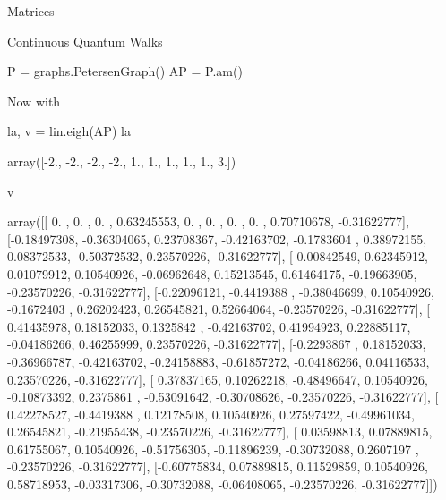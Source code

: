 \begin{chap}{Matrices}
\begin{sect}{Continuous Quantum Walks}
\begin{sagecode}
\begin{sageinput}
P = graphs.PetersenGraph()
AP = P.am()
\end{sageinput}
\begin{sageoutput}
\end{sageoutput}
\end{sagecode}
%
\begin{para}
Now with
\end{para}
%
\begin{sagecode}
\begin{sageinput}
la, v = lin.eigh(AP)
la
\end{sageinput}
\begin{sageoutput}
array([-2., -2., -2., -2.,  1.,  1.,  1.,  1.,  1.,  3.])
\end{sageoutput}
\end{sagecode}
%
\begin{sagecode}
\begin{sageinput}
v
\end{sageinput}
\begin{sageoutput}
array([[ 0.        ,  0.        ,  0.        ,  0.63245553,  0.        ,
         0.        ,  0.        ,  0.        ,  0.70710678, -0.31622777],
       [-0.18497308, -0.36304065,  0.23708367, -0.42163702, -0.1783604 ,
         0.38972155,  0.08372533, -0.50372532,  0.23570226, -0.31622777],
       [-0.00842549,  0.62345912,  0.01079912,  0.10540926, -0.06962648,
         0.15213545,  0.61464175, -0.19663905, -0.23570226, -0.31622777],
       [-0.22096121, -0.4419388 , -0.38046699,  0.10540926, -0.1672403 ,
         0.26202423,  0.26545821,  0.52664064, -0.23570226, -0.31622777],
       [ 0.41435978,  0.18152033,  0.1325842 , -0.42163702,  0.41994923,
         0.22885117, -0.04186266,  0.46255999,  0.23570226, -0.31622777],
       [-0.2293867 ,  0.18152033, -0.36966787, -0.42163702, -0.24158883,
        -0.61857272, -0.04186266,  0.04116533,  0.23570226, -0.31622777],
       [ 0.37837165,  0.10262218, -0.48496647,  0.10540926, -0.10873392,
         0.2375861 , -0.53091642, -0.30708626, -0.23570226, -0.31622777],
       [ 0.42278527, -0.4419388 ,  0.12178508,  0.10540926,  0.27597422,
        -0.49961034,  0.26545821, -0.21955438, -0.23570226, -0.31622777],
       [ 0.03598813,  0.07889815,  0.61755067,  0.10540926, -0.51756305,
        -0.11896239, -0.30732088,  0.2607197 , -0.23570226, -0.31622777],
       [-0.60775834,  0.07889815,  0.11529859,  0.10540926,  0.58718953,
        -0.03317306, -0.30732088, -0.06408065, -0.23570226, -0.31622777]])
\end{sageoutput}
\end{sagecode}

\end{sect}
\end{chap}
